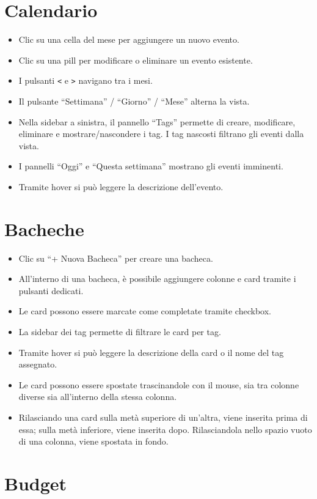 \documentclass[a4paper,12pt]{report}
\begin{document}
\section*{Calendario}
\begin{itemize}
    \item Clic su una cella del mese per aggiungere un nuovo evento.
    \item Clic su una pill per modificare o eliminare un evento esistente.
    \item I pulsanti \texttt{<} e \texttt{>} navigano tra i mesi.
    \item Il pulsante ``Settimana'' / ``Giorno'' / ``Mese'' alterna la vista.
    \item Nella sidebar a sinistra, il pannello ``Tags'' permette di creare, modificare, eliminare e mostrare/nascondere i tag. I tag nascosti filtrano gli eventi dalla vista.
    \item I pannelli ``Oggi'' e ``Questa settimana'' mostrano gli eventi imminenti.
    \item Tramite hover si può leggere la descrizione dell'evento.
\end{itemize}

\section*{Bacheche}
\begin{itemize}
    \item Clic su ``+ Nuova Bacheca'' per creare una bacheca.
    \item All'interno di una bacheca, è possibile aggiungere colonne e card tramite i pulsanti dedicati.
    \item Le card possono essere marcate come completate tramite checkbox.
    \item La sidebar dei tag permette di filtrare le card per tag.
    \item Tramite hover si può leggere la descrizione della card o il nome del tag assegnato.
    \item Le card possono essere spostate trascinandole con il mouse, sia tra
    colonne diverse sia all'interno della stessa colonna.
    \item Rilasciando una card sulla metà superiore di un'altra, viene inserita
    prima di essa; sulla metà inferiore, viene inserita dopo. Rilasciandola
    nello spazio vuoto di una colonna, viene spostata in fondo.
\end{itemize}

\section*{Budget}
\end{document}
